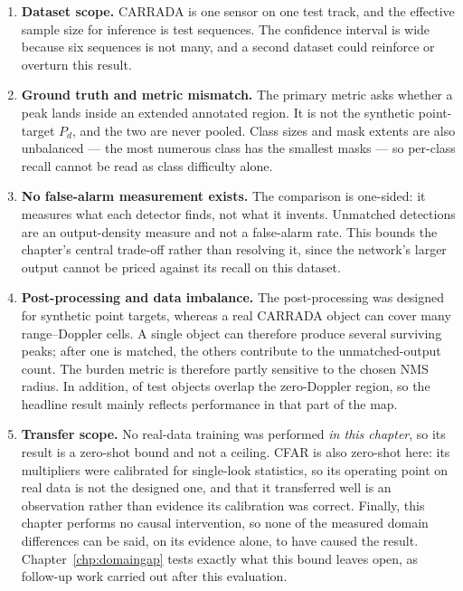 \begin{enumerate}
\itemsep4pt

\item \textbf{Dataset scope.} CARRADA is one sensor on one test track, and the effective sample
size for inference is \RoneNseq{} test sequences. The confidence interval is wide because six
sequences is not many, and a second dataset could reinforce or overturn this result.

\item \textbf{Ground truth and metric mismatch.} The primary metric asks whether a peak lands inside
an extended annotated region. It is not the synthetic point-target $P_d$, and the two are never
pooled. Class sizes and mask extents are also unbalanced --- the most numerous class has the smallest
masks --- so per-class recall cannot be read as class difficulty alone.

\item \textbf{No false-alarm measurement exists.} The comparison is one-sided: it measures what each
detector finds, not what it invents. Unmatched detections are an output-density measure and not a
false-alarm rate. This bounds the chapter's central trade-off rather than resolving it, since the
network's larger output cannot be priced against its recall on this dataset.

\item \textbf{Post-processing and data imbalance.} The post-processing was designed for synthetic
point targets, whereas a real CARRADA object can cover many range--Doppler cells. A single object
can therefore produce several surviving peaks; after one is matched, the others contribute to the
unmatched-output count. The burden metric is therefore partly sensitive to the chosen NMS radius. In
addition, \RoneNearZeroFrac{} of test objects overlap the zero-Doppler region, so the headline
result mainly reflects performance in that part of the map.

\item \textbf{Transfer scope.} No real-data training was performed \emph{in this chapter}, so its
result is a zero-shot bound and not a ceiling. CFAR is also zero-shot here: its multipliers were
calibrated for single-look statistics, so its operating point on real data is not the designed one,
and that it transferred well is an observation rather than evidence its calibration was correct.
Finally, this chapter performs no causal intervention, so none of the measured domain differences
can be said, on its evidence alone, to have caused the result. Chapter~\ref{chp:domaingap} tests
exactly what this bound leaves open, as follow-up work carried out after this evaluation.

\end{enumerate}

